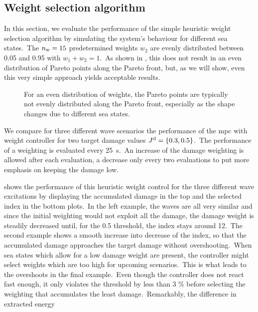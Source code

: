 \subsection{Weight selection algorithm}
In this section, we evaluate the performance of the simple heuristic weight selection algorithm by simulating the system's behaviour for different sea states.\ 
The $n_\mathrm{w}=15$ predetermined weights $w_2$ are evenly distributed between 0.05 and 0.95 with $w_1+w_2=1$.\ 
As shown in , this does not result in an even distribution of Pareto points along the Pareto front, but, as we will show, even this very simple approach yields acceptable results.\
\begin{figure}[htb]
	\centering
	\fontsize{8}{0}\selectfont
	\def\svgwidth{0.4\textwidth}
	
	\caption{For an even distribution of weights, the Pareto points are typically not evenly distributed along the Pareto front, especially as the shape changes due to different sea states.}
	\label{fig:PF}
\end{figure}

We compare for three different wave scenarios the performance of the \ac{mpc} with weight controller for two target damage values $J^\mathrm{d} = \left\{0.3, 0.5\right\}$.\ 
The performance of a weighting is evaluated every \SI{25}{\second}.\ 
An increase of the damage weighting is allowed after each evaluation, a decrease only every two evaluations to put more emphasis on keeping the damage low.

 shows the performance of this heuristic weight control for the three different wave excitations by displaying the accumulated damage in the top and the selected index in the bottom plots.\ 
In the left example, the waves are all very similar and since the initial weighting would not exploit all the damage, the damage weight is steadily decreased until, for the 0.5 threshold, the index stays around 12.\
The second example shows a smooth increase into decrease of the index, so that the accumulated damage approaches the target damage without overshooting.\ 
When sea states which allow for a low damage weight are present, the controller might select weights which are too high for upcoming scenarios.\ 
This is what leads to the overshoots in the final example.\ 
Even though the controller does not react fast enough, it only violates the threshold by less than 3 \% before selecting the weighting that accumulates the least damage.\ 
Remarkably, the difference in extracted energy

